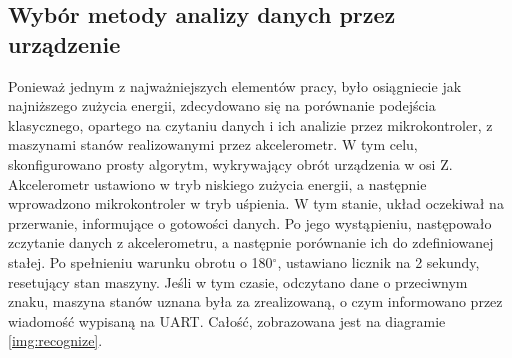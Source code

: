 \subsection{Wybór metody analizy danych przez urządzenie}
\label{sub:recognize-choice}
Ponieważ jednym z najważniejszych elementów pracy, było osiągniecie jak najniższego zużycia energii, zdecydowano się na porównanie podejścia klasycznego, opartego na czytaniu danych i ich analizie przez mikrokontroler, z maszynami stanów realizowanymi przez akcelerometr. W tym celu, skonfigurowano prosty algorytm, wykrywający obrót urządzenia w osi Z. Akcelerometr ustawiono w tryb niskiego zużycia energii, a następnie wprowadzono mikrokontroler w tryb uśpienia. W tym stanie, układ oczekiwał na przerwanie, informujące o gotowości danych. Po jego wystąpieniu, następowało zczytanie danych z akcelerometru, a następnie porównanie ich do zdefiniowanej stałej. Po spełnieniu warunku obrotu o 180$^{\circ}$, ustawiano licznik na 2 sekundy, resetujący stan maszyny. Jeśli w tym czasie, odczytano dane o przeciwnym znaku, maszyna stanów uznana była za zrealizowaną, o czym informowano przez wiadomość wypisaną na UART. Całość, zobrazowana jest na diagramie \ref{img:recognize}.

